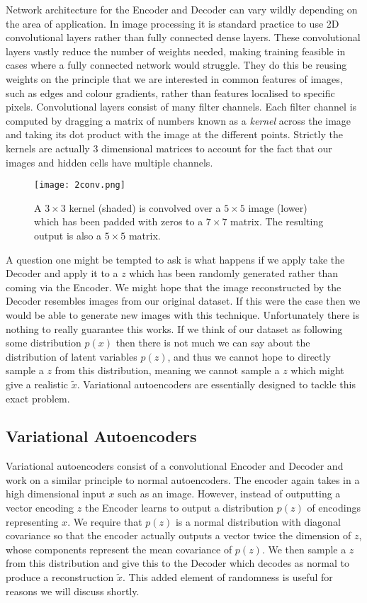 \documentclass{article}
\theoremstyle{definition}
\begin{document}
Network architecture for the Encoder and Decoder can vary wildly depending on the area of application.
In image processing it is standard practice to use 2D convolutional layers rather than fully connected dense layers.
These convolutional layers vastly reduce the number of weights needed, making training feasible in cases where a fully connected network would struggle.
They do this be reusing weights on the principle that we are interested in common features of images, such as edges and colour gradients, rather than features localised to specific pixels.
Convolutional layers consist of many filter channels.
Each filter channel is computed by dragging a matrix of numbers known as a \textit{kernel} across the image and taking its dot product with the image at the different points.
Strictly the kernels are actually 3 dimensional matrices to account for the fact that our images and hidden cells have multiple channels.

\begin{figure}[h]
  \centering
  \texttt{[image: 2conv.png]}
  \caption{A $3 \times 3$ kernel (shaded) is convolved over a $5 \times 5$ image (lower) which has been padded with zeros to a $7 \times 7$ matrix. The resulting output is also a $5 \times 5$ matrix.}
\end{figure}%

A question one might be tempted to ask is what happens if we apply take the Decoder and apply it to a $z$ which has been randomly generated rather than coming via the Encoder.
We might hope that the image reconstructed by the Decoder resembles images from our original dataset.
If this were the case then we would be able to generate new images with this technique.
Unfortunately there is nothing to really guarantee this works.
If we think of our dataset as following some distribution $p(x)$ then there is not much we can say about the distribution of latent variables $p(z)$, and thus we cannot hope to directly sample a $z$ from this distribution, meaning we cannot sample a $z$ which might give a realistic $\widetilde{x}$.
Variational autoencoders are essentially designed to tackle this exact problem.


\subsection{Variational Autoencoders}

Variational autoencoders consist of a convolutional Encoder and Decoder and work on a similar principle to normal autoencoders.
The encoder again takes in a high dimensional input $x$ such as an image.
However, instead of outputting a vector encoding $z$ the Encoder learns to output a distribution $p(z)$ of encodings representing $x$.
We require that $p(z)$ is a normal distribution with diagonal covariance so that the encoder actually outputs a vector twice the dimension of $z$, whose components represent the mean covariance of $p(z)$.
We then sample a $z$ from this distribution and give this to the Decoder which decodes as normal to produce a reconstruction $\widetilde{x}$.
This added element of randomness is useful for reasons we will discuss shortly.
\end{document}
